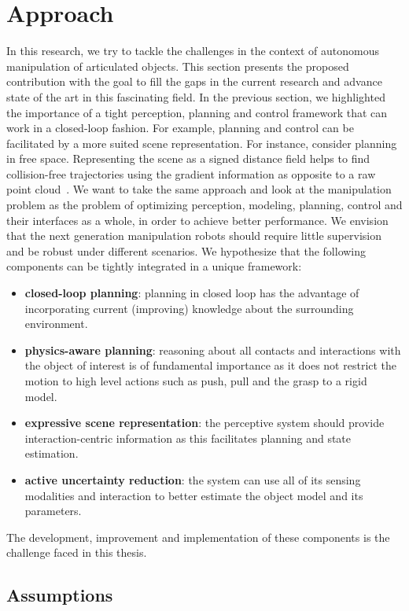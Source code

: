 \section{Approach}
\label{sec:Approach}

In this research, we try to tackle the challenges in the context of autonomous manipulation of articulated objects. This section presents the proposed contribution with the goal to fill the gaps in the current research and advance state of the art in this fascinating field. In the previous section, we highlighted the importance of a tight perception, planning and control framework that can work in a closed-loop fashion. For example, planning and control can be facilitated by a more suited scene representation. For instance, consider planning in free space. Representing the scene as a signed distance field helps to find collision-free trajectories using the gradient information as opposite to a raw point cloud~\cite{oleynikova2017voxblox}. We want to take the same approach and look at the manipulation problem as the problem of optimizing perception, modeling, planning, control and their interfaces as a whole, in order to achieve better performance. We envision that the next generation manipulation robots should require little supervision and be robust under different scenarios. We hypothesize that the following components can be tightly integrated in a unique framework:
\begin{itemize}
\item \textbf{closed-loop planning}: planning in closed loop has the advantage of incorporating current (improving) knowledge about the surrounding environment.
\item \textbf{physics-aware planning}: reasoning about all contacts and interactions with the object of interest is of fundamental importance as it does not restrict the motion to high level actions such as push, pull and the grasp to a rigid model.
\item \textbf{expressive scene representation}: the perceptive system should provide interaction-centric information as this facilitates planning and state estimation.
\item \textbf{active uncertainty reduction}: the system can use all of its sensing modalities and interaction to better estimate the object model and its parameters. 
\end{itemize}
The development, improvement and implementation of these components is the challenge faced in this thesis. 

\subsection{Assumptions} 

